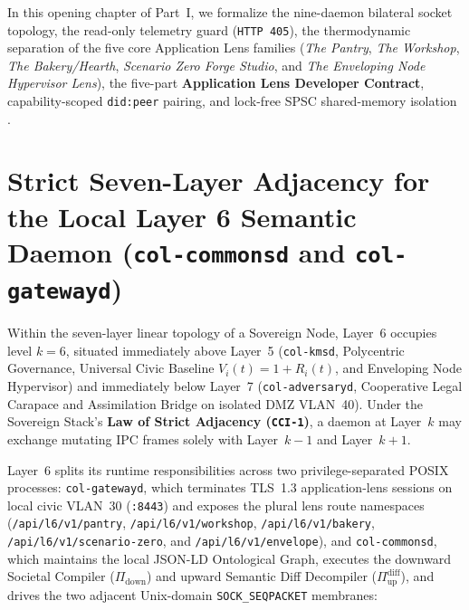 In this opening chapter of Part~I, we formalize the nine-daemon bilateral socket topology, the
read-only telemetry guard (\texttt{HTTP 405}), the thermodynamic separation of the five core
Application Lens families (\textit{The Pantry}, \textit{The Workshop}, \textit{The Bakery/Hearth},
\textit{Scenario Zero Forge Studio}, and \textit{The Enveloping Node Hypervisor Lens}), the
five-part \textbf{Application Lens Developer Contract}, capability-scoped \texttt{did:peer}
pairing, and lock-free SPSC shared-memory isolation \parencite{beer1972,beer1974,miller2006robust}.

\section{Strict Seven-Layer Adjacency for the Local Layer 6 Semantic Daemon (\texttt{col-commonsd} and \texttt{col-gatewayd})}
\label{sec:ch1-l6-adjacency}

Within the seven-layer linear topology of a Sovereign Node, Layer~6 occupies level $k = 6$,
situated immediately above Layer~5 (\texttt{col-kmsd}, Polycentric Governance, Universal Civic
Baseline $V_i(t)=1+R_i(t)$, and Enveloping Node Hypervisor) and immediately below Layer~7
(\texttt{col-adversaryd}, Cooperative Legal Carapace and Assimilation Bridge on isolated DMZ
VLAN~40). Under the Sovereign Stack's \textbf{Law of Strict Adjacency (\texttt{CCI-1})}, a daemon
at Layer~$k$ may exchange mutating IPC frames solely with Layer~$k-1$ and Layer~$k+1$.

Layer~6 splits its runtime responsibilities across two privilege-separated POSIX processes:
\texttt{col-gatewayd}, which terminates TLS~1.3 application-lens sessions on local civic
VLAN~30 (\texttt{:8443}) and exposes the plural lens route namespaces
(\texttt{/api/l6/v1/pantry}, \texttt{/api/l6/v1/workshop}, \texttt{/api/l6/v1/bakery},
\texttt{/api/l6/v1/scenario-zero}, and \texttt{/api/l6/v1/envelope}), and \texttt{col-commonsd},
which maintains the local JSON-LD Ontological Graph, executes the downward Societal Compiler
($\Pi_{\mathrm{down}}$) and upward Semantic Diff Decompiler ($\Pi_{\mathrm{up}}^{\mathrm{diff}}$),
and drives the two adjacent Unix-domain \texttt{SOCK\_SEQPACKET} membranes:


